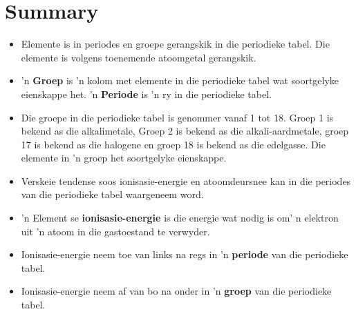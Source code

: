             \section{Summary}
            \nopagebreak
            \label{m38757*uid0123}\begin{itemize}[noitemsep]
            \label{m38757*id79342}\item Elemente is in periodes en groepe gerangskik in die periodieke tabel. Die elemente is volgens toenemende atoomgetal gerangskik.
\label{m38757*id97342}\item 'n \textbf{Groep} is 'n kolom met elemente in die periodieke tabel wat soortgelyke eienskappe het. 'n \textbf{Periode} is 'n ry in die periodieke tabel.
\item Die groepe in die periodieke tabel is genommer vanaf 1 tot 18. Groep 1 is bekend as die alkalimetale, Groep 2 is bekend as die alkali-aardmetale, groep 17 is bekend as die halogene en groep 18 is bekend as die edelgasse. Die elemente in 'n groep het soortgelyke eienskappe.
\item Verskeie tendense soos ionisasie-energie en atoomdeursnee kan in die periodes van die periodieke tabel waargeneem word. \label{m38757*uid184}
\label{m38757*uid186}\item 'n Element se \textbf{ionisasie-energie} is die energie wat nodig is om' n elektron uit 'n atoom in die gastoestand te verwyder.
\label{m38757*uid187}\item Ionisasie-energie neem toe van links na regs in 'n \textbf{periode} van die periodieke tabel.
\label{m38757*uid188}\item Ionisasie-energie neem af van bo na onder in 'n \textbf{groep} van die periodieke tabel.
\end{itemize}
        \label{m38757*eip-219}
            



